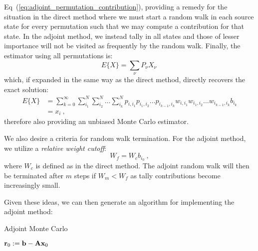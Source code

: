 Eq~(\ref{eq:adjoint_permutation_contribution}), providing a remedy for
the situation in the direct method where we must start a random walk
in each source state for every permutation such that we may compute a
contribution for that state. In the adjoint method, we instead tally
in all states and those of lesser importance will not be visited as
frequently by the random walk. Finally, the estimator using all
permutations is:
\begin{equation}
  E\{X\} = \sum_{\nu} P_{\nu} X_{\nu}\:
  \label{eq:adjoint_expectation_value}
\end{equation}
which, if expanded in the same way as the direct method, directly
recovers the exact solution:
\begin{equation}
  \begin{split}
    E\{X\} &=\sum_{k=0}^{\infty}\sum_{i_1}^{N}\sum_{i_2}^{N}\ldots
    \sum_{i_k}^{N} p_{i,i_1}p_{i_1,i_2}\ldots p_{i_{k-1},i_k}
    w_{i,i_1}w_{i_1,i_2}\ldots w_{i_{k-1},i_k} b_{i_k} \\ &= x_i\:,
  \end{split}
  \label{eq:adjoint_expectation_expansion}
\end{equation}
therefore also providing an unbiased Monte Carlo estimator.

We also desire a criteria for random walk termination. For the adjoint
method, we utilize a \textit{relative weight cutoff}:
\begin{equation}
  W_f = W_c b_{i_0}\:,
  \label{eq:relative_weight_cutoff}
\end{equation}
where $W_c$ is defined as in the direct method. The adjoint random
walk will then be terminated after $m$ steps if $W_m < W_f$ as tally
contributions become increasingly small.

Given these ideas, we can then generate an algorithm for implementing
the adjoint method:
\begin{algorithm}[htpb!]
  \caption{Adjoint Monte Carlo}
  \label{alg:adjoint_mc}
  \begin{algorithmic}
    \State $\mathbf{r}_0 := \mathbf{b}-\mathbf{A}\mathbf{x}_0$
  \end{algorithmic}
\end{algorithm}


